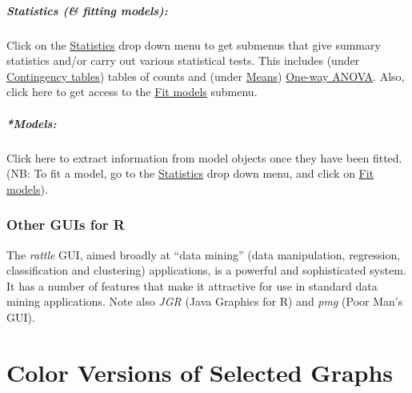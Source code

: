 \documentclass{tufte-book}\usepackage[]{graphicx}\usepackage[]{color}
\begin{document}
\paragraph{Statistics (\& fitting models):} Click on the
\underline{Statistics} drop down menu to get submenus that give
summary statistics and/or carry out various statistical tests.  This
includes (under \underline{Contingency tables}) tables of counts
and (under \underline{Means}) \underline{One-way ANOVA}.
Also, click here to get access to the \underline{Fit models} submenu.

\paragraph{*Models:} Click here to extract information from model
objects once they have been fitted.  (NB: To fit a model, go to the
\underline{Statistics} drop down menu, and click on \underline{Fit
  models}).

\subsection*{Other GUIs for R}

The {\em rattle} GUI, aimed broadly at ``data mining''  (data
manipulation, regression, classification and clustering) applications,
is a powerful and sophisticated system.  It has a number of features
that make it attractive for use in standard data mining applications.
Note also \textit{JGR} (Java Graphics for R) and \textit{pmg} (Poor
Man's GUI).
\cleartooddpage

\chapter{Color Versions of Selected Graphs}\label{app:C}

\end{document}
